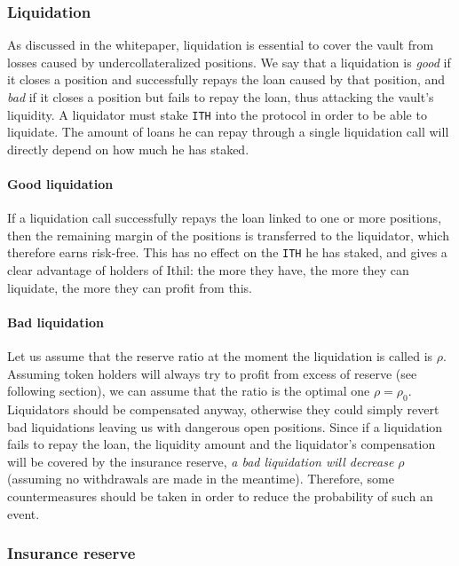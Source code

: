 \documentclass[a4paper,10 pt]{article}
\theoremstyle{definition}
\begin{document}
\subsubsection{Liquidation}

As discussed in the whitepaper, liquidation is essential to cover the vault from losses caused by undercollateralized positions. We say that a liquidation is {\it good} if it closes a position and successfully repays the loan caused by that position, and {\it bad} if it closes a position but fails to repay the loan, thus attacking the vault's liquidity. A liquidator must stake \verb|ITH| into the protocol in order to be able to liquidate. The amount of loans he can repay through a single liquidation call will directly depend on how much he has staked.

\paragraph{Good liquidation}
If a liquidation call successfully repays the loan linked to one or more positions, then the remaining margin of the positions is transferred to the liquidator, which therefore earns risk-free. This has no effect on the \verb|ITH| he has staked, and gives a clear advantage of holders of Ithil: the more they have, the more they can liquidate, the more they can profit from this.

\paragraph{Bad liquidation}
Let us assume that the reserve ratio at the moment the liquidation is called is $\rho$. Assuming token holders will always try to profit from excess of reserve (see following section), we can assume that the ratio is the optimal one $\rho=\rho_0$.  Liquidators should be compensated anyway, otherwise they could simply revert bad liquidations leaving us with dangerous open positions. Since if a liquidation fails to repay the loan, the liquidity amount and the liquidator's compensation will be covered by the insurance reserve, {\it a bad liquidation will decrease $\rho$} (assuming no withdrawals are made in the meantime). Therefore, some countermeasures should be taken in order to reduce the probability of such an event.

\subsubsection{Insurance reserve}
\end{document}
